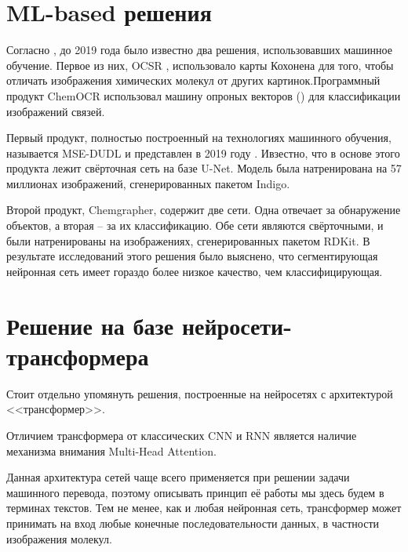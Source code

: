 \section{ML-based решения} \label{ch1:sec3}

Согласно \cite{rajan2020review}, до 2019 года было известно два решения, использовавших машинное обучение. Первое из них, OCSR \cite{gkoutos2003chemical}, использовало карты Кохонена для того, чтобы отличать изображения химических молекул от других картинок.Программный продукт ChemOCR использовал машину опроных векторов (\cite{cortes1995support}) для  классификации изображений связей.

Первый продукт, полностью построенный на технологиях машинного обучения, называется MSE-DUDL и представлен в 2019 году \cite{staker2019molecular}. Ивзестно, что в основе этого продукта лежит свёрточная сеть на базе U-Net. Модель была натренирована на 57 миллионах изображений, сгенерированных пакетом Indigo.

Второй продукт, Chemgrapher, содержит две сети. Одна отвечает за обнаружение объектов, а вторая -- за их классификацию. Обе сети являются свёрточными, и были натренированы на изображениях, сгенерированных пакетом RDKit. В результате исследований этого решения было выяснено, что сегментирующая нейронная сеть имеет гораздо более низкое качество, чем классифицирующая.

\section{Решение на базе нейросети-трансформера}

Стоит отдельно упомянуть решения, построенные на нейросетях с архитектурой <<трансформер>>.

Отличием трансформера от классических CNN и RNN является наличие механизма внимания Multi-Head Attention.

Данная архитектура сетей чаще всего применяется при решении задачи машинного перевода, поэтому описывать принцип её работы мы здесь будем в терминах текстов. Тем не менее, как и любая нейронная сеть, трансформер может принимать на вход любые конечные последовательности данных, в частности изображения молекул.

